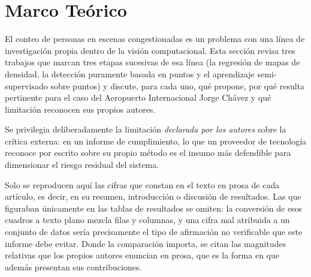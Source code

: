 %
%
\section{Marco Teórico}
\label{sec:antecedentes}

El conteo de personas en escenas congestionadas es un problema con una
línea de investigación propia dentro de la visión computacional. Esta
sección revisa tres trabajos que marcan tres etapas sucesivas de esa
línea (la regresión de mapas de densidad, la detección puramente
basada en puntos y el aprendizaje semi-supervisado sobre puntos) y
discute, para cada uno, qué propone, por qué resulta pertinente para el
caso del Aeropuerto Internacional Jorge Chávez y qué limitación
reconocen sus propios autores.

Se privilegia deliberadamente la limitación \emph{declarada por los
autores} sobre la crítica externa: en un informe de cumplimiento, lo que
un proveedor de tecnología reconoce por escrito sobre su propio método
es el insumo más defendible para dimensionar el riesgo residual del
sistema.

Solo se reproducen aquí las cifras que constan en el texto en prosa de
cada artículo, es decir, en su resumen, introducción o discusión de
resultados. Las que
figuraban únicamente en las tablas de resultados se omiten: la conversión
de esos cuadros a texto plano mezcla filas y columnas, y una cifra mal
atribuida a un conjunto de datos sería precisamente el tipo de afirmación
no verificable que este informe debe evitar. Donde la comparación importa,
se citan las magnitudes relativas que los propios autores enuncian en
prosa, que es la forma en que además presentan sus contribuciones.

